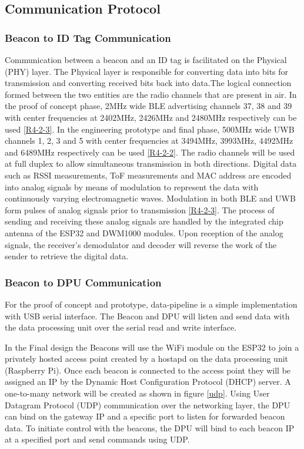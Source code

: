 \pagebreak
\subsection{Communication Protocol}
\subsubsection{Beacon to ID Tag Communication}
\medskip
Communication between a beacon and an ID tag is facilitated on the Physical (PHY) layer. The Physical layer is responsible for converting data into bits for transmission and converting received bits back into data.The logical connection formed between the two entities are the radio channels that are present in air. In the proof of concept phase, 2MHz wide BLE advertising channels 37, 38 and 39 with center frequencies at 2402MHz, 2426MHz and 2480MHz respectively can be used \ref{R4-2-3}. In the engineering prototype and final phase, 500MHz wide UWB channels 1, 2, 3 and 5 with center frequencies at 3494MHz, 3993MHz, 4492MHz and 6489MHz respectively can be used \ref{R4-2-2}. The radio channels will be used at full duplex to allow simultaneous transmission in both directions. Digital data such as RSSI measurements, ToF measurements and MAC address are encoded into analog signals by means of modulation to represent the data with continuously varying electromagnetic waves. Modulation in both BLE and UWB form pulses of analog signals prior to transmission \ref{R4-2-3}. The process of sending and receiving these analog signals are handled by the integrated chip antenna of the ESP32 and DWM1000 modules. Upon reception of the analog signals, the receiver's demodulator and decoder will reverse the work of the sender to retrieve the digital data. 


\pagebreak
\subsubsection{Beacon to DPU Communication}
\medskip
For the proof of concept and prototype, data-pipeline is a simple implementation with USB serial interface. The Beacon and DPU  will listen and send data with the data processing unit over the serial read and write interface. 

\bigskip
In the Final design the Beacons will use the WiFi module on the ESP32 to join a privately hosted access point created by a hostapd on the data processing unit (Raspberry Pi). Once each beacon is connected to the access point they will be assigned an IP by the Dynamic Host Configuration Protocol (DHCP) server. A one-to-many network will be created as shown in figure \ref{udp}. Using User Datagram Protocol (UDP) communication over the networking layer, the DPU can bind on the gateway IP and a specific port to listen for forwarded beacon data. To initiate control with the beacons, the DPU will bind to each beacon IP at a specified port and send commands using UDP.

